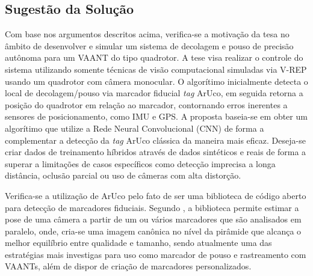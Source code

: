 \subsection{Sugestão da Solução}

Com base nos argumentos descritos acima, verifica-se a motivação da tesa no âmbito de desenvolver e simular um sistema de decolagem e pouso de precisão autônoma para um VAANT do tipo quadrotor. A tese visa realizar o controle do sistema utilizando somente técnicas de visão computacional simuladas via V-REP usando um quadrotor com câmera monocular. O algorítimo inicialmente detecta o local de decolagem/pouso via marcador fiducial \textit{tag} ArUco, em seguida retorna a posição do quadrotor em relação ao marcador, contornando erros inerentes a sensores de posicionamento, como IMU e GPS. A proposta baseia-se em obter um algorítimo que utilize a Rede Neural Convolucional (CNN) de forma a complementar a detecção da \textit{tag} ArUco clássica da maneira mais eficaz. Deseja-se criar dados de treinamento híbridos através de dados sintéticos e reais de forma a superar a limitações de casos específicos como detecção imprecisa a longa distância, oclusão parcial ou uso de câmeras com alta distorção. 

Verifica-se a utilização de ArUco pelo fato de ser uma biblioteca de código aberto para detecção de marcadores fiduciais. Segundo \citet{Aruco2014}, a biblioteca permite estimar a pose de uma câmera a partir de um ou vários marcadores que são analisados em paralelo, onde, cria-se uma imagem canônica no nível da pirâmide que alcança o melhor equilíbrio entre qualidade e tamanho, sendo atualmente uma das estratégias mais investigas para uso como marcador de pouso e rastreamento com VAANTs, além de dispor de criação de marcadores personalizados. 





